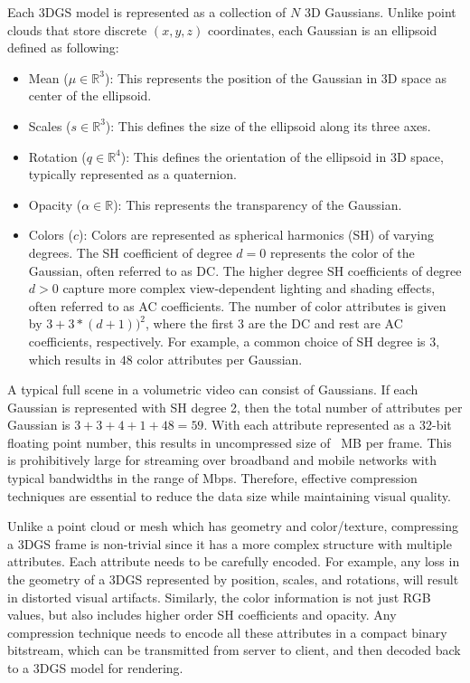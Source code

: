 Each 3DGS model is represented as a collection of $N$ 3D Gaussians. Unlike point clouds that store discrete $(x,y,z)$ coordinates, each Gaussian is an ellipsoid defined as following:
\begin{itemize}
\item Mean ($\mu \in \mathbb{R}^3$): This represents the position of the Gaussian in 3D space as center of the ellipsoid.
\item Scales ($s \in \mathbb{R}^3$): This defines the size of the ellipsoid along its three axes.
\item Rotation ($q \in \mathbb{R}^4$): This defines the orientation of the ellipsoid in 3D space, typically represented as a quaternion.
\item Opacity ($\alpha \in \mathbb{R}$): This represents the transparency of the Gaussian.
\item Colors ($c$): Colors are represented as spherical harmonics (SH) of varying degrees. The SH coefficient of degree $d = 0$ represents the color of the Gaussian, often referred to as DC. The higher degree SH coefficients of degree $d > 0$ capture more complex view-dependent lighting and shading effects, often referred to as AC coefficients. The number of color attributes is given by $3 + 3 * (d + 1))^2$, where the first 3 are the DC and rest are AC coefficients, respectively. For example, a common choice of SH degree is 3, which results in $48$ color attributes per Gaussian.
\end{itemize}

A typical full scene in a volumetric video can consist of  Gaussians. If each Gaussian is represented with SH degree 2, then the total number of attributes per Gaussian is $3 + 3 + 4 + 1 + 48 = 59$. With each attribute represented as a 32-bit floating point number, this results in uncompressed size of ~MB per frame. This is prohibitively large for streaming over broadband and  mobile networks with typical bandwidths in the range of  Mbps. Therefore, effective compression techniques are essential to reduce the data size while maintaining visual quality.

Unlike a point cloud or mesh which has geometry and color/texture, compressing a 3DGS frame is non-trivial since it has a more complex structure with multiple attributes. Each attribute needs to be carefully encoded. For example, any loss in the geometry of a 3DGS represented by position, scales, and rotations, will result in distorted visual artifacts. Similarly, the color information is not just RGB values, but also includes higher order SH coefficients and opacity. Any compression technique needs to encode all these attributes in a compact binary bitstream, which can be transmitted from server to client, and then decoded back to a 3DGS model for rendering.

